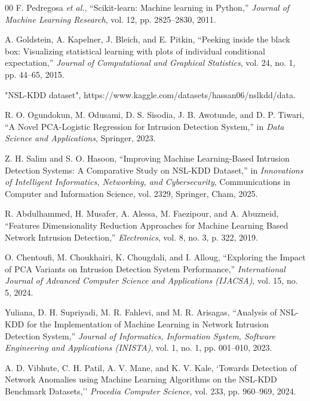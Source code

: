 \documentclass[conference]{IEEEtran}
\begin{document}
\begin{thebibliography}{00}
 F. Pedregosa \textit{et al.}, ``Scikit-learn: Machine learning in Python,'' \textit{Journal of Machine Learning Research}, vol. 12, pp. 2825--2830, 2011.

 A. Goldstein, A. Kapelner, J. Bleich, and E. Pitkin, ``Peeking inside the black box: Visualizing statistical learning with plots of individual conditional expectation,'' \textit{Journal of Computational and Graphical Statistics}, vol. 24, no. 1, pp. 44--65, 2015.

 "NSL-KDD dataset", https://www.kaggle.com/datasets/hassan06/nslkdd/data.

 R. O. Ogundokun, M. Odusami, D. S. Sisodia, J. B. Awotunde, and D. P. Tiwari, ``A Novel PCA-Logistic Regression for Intrusion Detection System,'' in \textit{Data Science and Applications}, Springer, 2023.

 Z. H. Salim and S. O. Hasoon, ``Improving Machine Learning-Based Intrusion Detection Systems: A Comparative Study on NSL-KDD Dataset,'' in \textit{Innovations of Intelligent Informatics, Networking, and Cybersecurity}, Communications in Computer and Information Science, vol. 2329, Springer, Cham, 2025.

 R. Abdulhammed, H. Musafer, A. Alessa, M. Faezipour, and A. Abuzneid, ``Features Dimensionality Reduction Approaches for Machine Learning Based Network Intrusion Detection,'' \textit{Electronics}, vol. 8, no. 3, p. 322, 2019.

 O. Chentoufi, M. Choukhairi, K. Chougdali, and I. Alloug, ``Exploring the Impact of PCA Variants on Intrusion Detection System Performance,'' \textit{International Journal of Advanced Computer Science and Applications (IJACSA)}, vol. 15, no. 5, 2024.

 Yuliana, D. H. Supriyadi, M. R. Fahlevi, and M. R. Arisagas, ``Analysis of NSL-KDD for the Implementation of Machine Learning in Network Intrusion Detection System,'' \textit{Journal of Informatics, Information System, Software Engineering and Applications (INISTA)}, vol. 1, no. 1, pp. 001--010, 2023.

 A. D. Vibhute, C. H. Patil, A. V. Mane, and K. V. Kale, `Towards Detection of Network Anomalies using Machine Learning Algorithms on the NSL-KDD Benchmark Datasets,'' \textit{Procedia Computer Science}, vol. 233, pp. 960--969, 2024.

\end{thebibliography}
\vspace{12pt}
\end{document}
